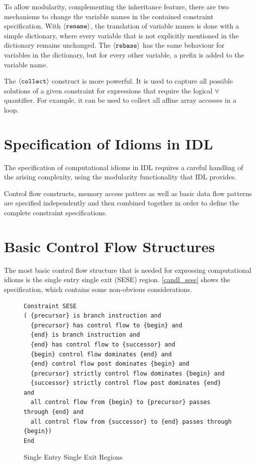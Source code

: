     To allow modularity, complementing the inheritance feature, there are two
    mechanisms to change the variable names in the contained constraint
    specification.
    With $\left<\text{\tt rename}\right>$, the translation of variable names is
    done with a simple dictionary, where every variable that is not explicitly
    mentioned in the dictionary remains unchanged.
    The $\left<\text{\tt rebase}\right>$ has the same behaviour for variables in
    the dictionary, but for every other variable, a prefix is added to the
    variable name.

    The $\left<\text{\tt collect}\right>$ construct is more powerful.
    It is used to capture all possible solutions of a given constraint for
    expressions that require the logical $\forall$ quantifier.
    For example, it can be used to collect all affine array accesses in a loop.

\section{Specification of Idioms in IDL}
\label{sec:idioms}

    The specification of computational idioms in IDL requires a careful
    handling of the arising complexity, using the modularity functionality that
    IDL provides.

    Control flow constructs, memory access patters as well as basic data flow
    patterns are specified independently and then combined together in order to
    define the complete constraint specifications.


\section{Basic Control Flow Structures}

    The most basic control flow structure that is needed for expressing
    computational idioms is the single entry single exit (SESE) region.
    \autoref{candl_sese} shows the specification, which contains some
    non-obvious considerations.

\begin{figure}[h]
\begin{lstlisting}[language=CAnDL]
Constraint SESE
( {precursor} is branch instruction and
  {precursor} has control flow to {begin} and
  {end} is branch instruction and
  {end} has control flow to {successor} and
  {begin} control flow dominates {end} and
  {end} control flow post dominates {begin} and
  {precursor} strictly control flow dominates {begin} and
  {successor} strictly control flow post dominates {end} and
  all control flow from {begin} to {precursor} passes through {end} and
  all control flow from {successor} to {end} passes through {begin})
End
\end{lstlisting}
\caption{Single Entry Single Exit Regions}
\label{candl_sese}
\end{figure}

